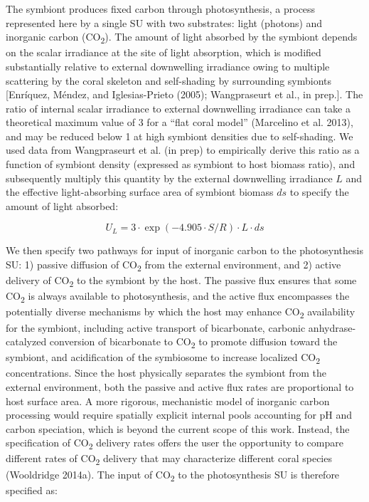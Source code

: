 \documentclass[]{elsarticle} %
\begin{document}
The symbiont produces fixed carbon through photosynthesis, a process
represented here by a single SU with two substrates: light (photons) and
inorganic carbon (CO\textsubscript{2}). The amount of light absorbed by
the symbiont depends on the scalar irradiance at the site of light
absorption, which is modified substantially relative to external
downwelling irradiance owing to multiple scattering by the coral
skeleton and self-shading by surrounding symbionts {[}Enríquez, Méndez,
and Iglesias-Prieto (2005); Wangpraseurt et al., in prep.{]}. The ratio
of internal scalar irradiance to external downwelling irradiance can
take a theoretical maximum value of 3 for a ``flat coral model''
(Marcelino et al. 2013), and may be reduced below 1 at high symbiont
densities due to self-shading. We used data from Wangpraseurt et al. (in
prep) to empirically derive this ratio as a function of symbiont density
(expressed as symbiont to host biomass ratio), and subsequently multiply
this quantity by the external downwelling irradiance \(L\) and the
effective light-absorbing surface area of symbiont biomass \(ds\) to
specify the amount of light absorbed:

\begin{equation} U_L = 3 \cdot \exp(-4.905 \cdot S/R) \cdot L \cdot ds \end{equation}

We then specify two pathways for input of inorganic carbon to the
photosynthesis SU: 1) passive diffusion of CO\textsubscript{2} from the
external environment, and 2) active delivery of CO\textsubscript{2} to
the symbiont by the host. The passive flux ensures that some
CO\textsubscript{2} is always available to photosynthesis, and the
active flux encompasses the potentially diverse mechanisms by which the
host may enhance CO\textsubscript{2} availability for the symbiont,
including active transport of bicarbonate, carbonic anhydrase-catalyzed
conversion of bicarbonate to CO\textsubscript{2} to promote diffusion
toward the symbiont, and acidification of the symbiosome to increase
localized CO\textsubscript{2} concentrations. Since the host physically
separates the symbiont from the external environment, both the passive
and active flux rates are proportional to host surface area. A more
rigorous, mechanistic model of inorganic carbon processing would require
spatially explicit internal pools accounting for pH and carbon
speciation, which is beyond the current scope of this work. Instead, the
specification of CO\textsubscript{2} delivery rates offers the user the
opportunity to compare different rates of CO\textsubscript{2} delivery
that may characterize different coral species (Wooldridge 2014a). The
input of CO\textsubscript{2} to the photosynthesis SU is therefore
specified as:
\end{document}
